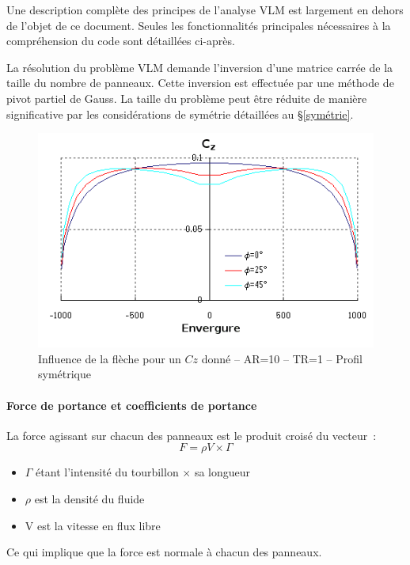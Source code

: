 \documentclass[a4paper,twoside,12pt,dvips]{article}
\begin{document}
Une description complète des principes de l’analyse VLM est largement en
dehors de l’objet de ce document. Seules les fonctionnalités principales
nécessaires à la compréhension du code sont détaillées ci-après. 

La résolution du problème VLM demande l’inversion d’une matrice carrée de 
la taille du nombre de panneaux. Cette inversion est effectuée par une
méthode de pivot partiel de Gauss. La taille du problème peut être réduite
de manière significative par les considérations de symétrie détaillées au
\S\ref{symétrie}.

\begin{figure}[htbp]
	\centering
	\includegraphics[width=0.8\linewidth]{img-17-fr}\centering 
	\caption{Influence de la flèche pour un $Cz$ donné –  AR=10 – TR=1 –  
	Profil symétrique\protect\footnotemark}
	\label{img:influence_flèche}
\end{figure}


\paragraph{Force de portance et coefficients de portance}
La force agissant sur chacun des panneaux est le produit croisé du vecteur~:
$$ F = \rho V \times \Gamma $$
\begin{itemize}[label=]
	\item $\Gamma$ étant l’intensité du tourbillon $\times$ sa longueur
	\item $\rho$ est la densité du fluide
	\item V est la vitesse en flux libre
\end{itemize}

Ce qui implique que la force est normale à chacun des panneaux.
\end{document}

